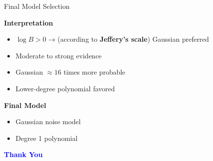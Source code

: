 \documentclass[aspectratio=169]{beamer}
\begin{document}
\begin{frame}{Final Model Selection}

\footnotesize

\textbf{Interpretation}

\begin{itemize}

\item $\log B > 0$ → (according to \textbf{Jeffery's scale}) Gaussian preferred

\item Moderate to strong evidence

\item Gaussian $\approx 16$ times more probable

\item Lower-degree polynomial favored

\end{itemize}

\vspace{0.3cm}

\textbf{Final Model}

\begin{itemize}

\item Gaussian noise model

\item Degree 1 polynomial

\end{itemize}

\end{frame}


\begin{frame}
\centering

{\Huge \textcolor{blue}{\textbf{Thank You}}}

\end{frame}
\end{document}
